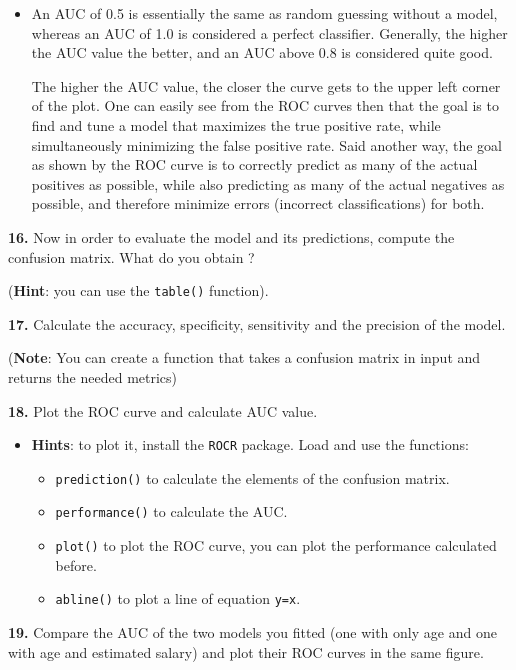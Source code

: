 \documentclass[]{book}
\providecommand{\tightlist}{%
  \setlength{\itemsep}{0pt}\setlength{\parskip}{0pt}}
\newenvironment{rmdblock}[1]
  {\begin{shaded*}
  \begin{itemize}
  \renewcommand{\labelitemi}{
    \raisebox{-.7\height}[0pt][0pt]{
      {\setkeys{Gin}{width=2em,keepaspectratio}\texttt{[image: img/icons/\#1]}}
    }
  }
  \item
  }
  {
  \end{itemize}
  \end{shaded*}
  }
\newenvironment{rmdinsight}
  {\begin{rmdblock}{insight}}
  {\end{rmdblock}}
\theoremstyle{definition}
\theoremstyle{definition}
\theoremstyle{definition}
\theoremstyle{remark}
\begin{document}
\begin{rmdinsight}
An AUC of 0.5 is essentially the same as random guessing without a
model, whereas an AUC of 1.0 is considered a perfect classifier.
Generally, the higher the AUC value the better, and an AUC above 0.8 is
considered quite good.

The higher the AUC value, the closer the curve gets to the upper left
corner of the plot. One can easily see from the ROC curves then that the
goal is to find and tune a model that maximizes the true positive rate,
while simultaneously minimizing the false positive rate. Said another
way, the goal as shown by the ROC curve is to correctly predict as many
of the actual positives as possible, while also predicting as many of
the actual negatives as possible, and therefore minimize errors
(incorrect classifications) for both.
\end{rmdinsight}

\textbf{16.} Now in order to evaluate the model and its predictions,
compute the confusion matrix. What do you obtain ?

(\textbf{Hint}: you can use the \texttt{table()} function).

\textbf{17.} Calculate the accuracy, specificity, sensitivity and the
precision of the model.

(\textbf{Note}: You can create a function that takes a confusion matrix
in input and returns the needed metrics)

\textbf{18.} Plot the ROC curve and calculate AUC value.

\begin{rmdinsight}
\textbf{Hints}: to plot it, install the \texttt{ROCR} package. Load and
use the functions:

\begin{itemize}
\tightlist
\item
  \texttt{prediction()} to calculate the elements of the confusion
  matrix.
\item
  \texttt{performance()} to calculate the AUC.
\item
  \texttt{plot()} to plot the ROC curve, you can plot the performance
  calculated before.
\item
  \texttt{abline()} to plot a line of equation \texttt{y=x}.
\end{itemize}
\end{rmdinsight}

\textbf{19.} Compare the AUC of the two models you fitted (one with only
age and one with age and estimated salary) and plot their ROC curves in
the same figure.
\end{document}
